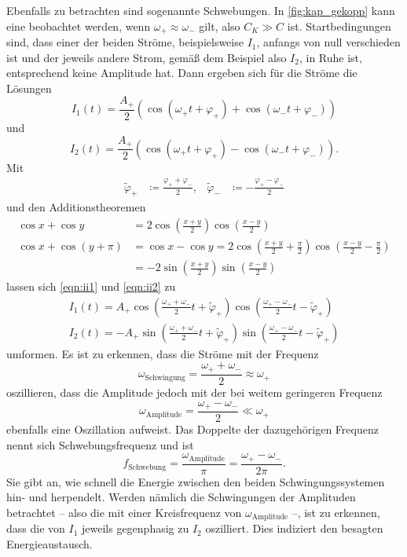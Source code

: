 Ebenfalls zu betrachten sind sogenannte Schwebungen. 
In \ref{fig:kap_gekopp} kann eine beobachtet werden, wenn ${\omega _+ \approx \omega _-}$ gilt, also 
${C_K \gg C}$ ist. 
Startbedingungen sind, dass einer der beiden Ströme, beispielsweise $I_1$, anfangs von null verschieden ist und der 
jeweils andere Strom, gemäß dem Beispiel also $I_2$, in Ruhe ist, entsprechend keine Amplitude hat. 
Dann ergeben sich für die Ströme die Lösungen 
\begin{equation}
    I_1 (t) = \frac{A_+}{2} ( \cos(\omega _+ t + \varphi _+) + \cos(\omega _- t + \varphi _-))
    \label{eqn:ii1}
\end{equation}
und 
\begin{equation}
    I_2 (t) = \frac{A_+}{2} ( \cos(\omega _+ t + \varphi _+) - \cos(\omega _- t + \varphi _-)) .
    \label{eqn:ii2}
\end{equation}
Mit 
\begin{align}
    \tilde{\varphi}_+ &\coloneq \frac{\varphi _+ + \varphi _-}{2} ,
    & \tilde{\varphi}_- &\coloneq - \frac{\varphi _+ - \varphi _-}{2}
\end{align}
und den Additionstheoremen 
\begin{align}
    \cos x + \cos y &= 2 \cos(\frac{x+y}{2}) \cos(\frac{x-y}{2}) \\
    \cos x + \cos(y + \pi) &= \cos x - \cos y = 2 \cos(\frac{x+y}{2} + \frac{\pi}{2}) \cos(\frac{x-y}{2} - \frac{\pi}{2}) \\
        &=-2  \sin(\frac{x+y}{2}) \sin(\frac{x-y}{2})
\end{align}
lassen sich \ref{eqn:ii1} und \ref{eqn:ii2} zu 
\begin{gather}
    I_1 (t)= A_+ \cos(\frac{\omega _+ + \omega _-}{2}t +\tilde{\varphi}_+) \cos(\frac{\omega _+ - \omega _-}{2}t -\tilde{\varphi}_+) \\
    I_2 (t)=-A_+ \sin(\frac{\omega _+ + \omega _-}{2}t +\tilde{\varphi}_+) \sin(\frac{\omega _+ - \omega _-}{2}t -\tilde{\varphi}_+)
\end{gather}
umformen.
Es ist zu erkennen, dass die Ströme mit der Frequenz 
\begin{equation}
    \omega _\text{Schwingung} = \frac{\omega _+ + \omega _-}{2} \approx \omega _+
\end{equation}
oszillieren, dass die Amplitude jedoch mit der bei weitem geringeren Frequenz 
\begin{equation}
    \omega _\text{Amplitude} = \frac{\omega _+ - \omega _-}{2} \ll \omega _+
\end{equation} 
ebenfalls eine Oszillation aufweist. 
Das Doppelte der dazugehörigen Frequenz nennt sich Schwebungsfrequenz und ist 
\begin{equation}
    f_\text{Schwebung}= \frac{\omega _\text{Amplitude}}{\pi}=\frac{\omega _+ - \omega _-}{2 \pi}.
    \label{eqn:fschwebung}
\end{equation} 
Sie gibt an, wie schnell die Energie zwischen den beiden Schwingungssystemen hin- und herpendelt. 
Werden nämlich die Schwingungen der Amplituden betrachtet -- also die mit einer Kreisfrequenz von $\omega _\text{Amplitude}$ --, 
ist zu erkennen, dass die von $I_1$ jeweils gegenphasig zu $I_2$ oszilliert. 
Dies indiziert den besagten Energieaustausch. 
\FloatBarrier

